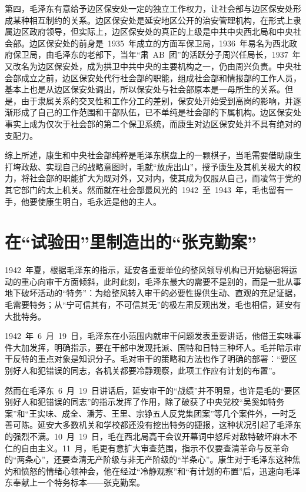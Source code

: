 第四，毛泽东有意给予边区保安处一定的独立工作权力，让社会部与边区保安处形成某种相互制约的关系。边区保安处是延安地区公开的治安管理机构，在形式上隶属边区政府领导，但实际上，边区保安处的真正的上级是中共中央西北局和中央社会部。边区保安处的前身是~1935~年成立的方面军保卫局，1936~年易名为西北政府保卫局，由毛泽东的老部下，当年“肃~AB~团”的活跃分子周兴任局长，1937~年又改名为边区保安处，成为拱卫中共中央的主要机构之一，仍由周兴负责。中央社会部成立之前，边区保安处代行社会部的职能，组成社会部和情报部的工作人员，基本上也是从边区保安处调出，所以保安处与社会部原本是一母所生的关系。但是，由于隶属关系的交叉性和工作分工的差别，保安处开始受到高岗的影响，并逐渐形成了自己的工作范围和干部队伍，已不单纯是社会部的下属机构。边区保安处事实上成为仅次于社会部的第二个保卫系统，而康生对边区保安处并不具有绝对的支配力。

综上所述，康生和中央社会部纯粹是毛泽东棋盘上的一颗棋子，当毛需要借助康生打垮政敌、实现自己的战略意图时，毛就“放虎出山”，授予康生及其机关极大的权力，将社会部的职能扩大为既对外，又对内，使其成为仅服从自己，而凌驾于党的其它部门的太上机关。然而就在社会部最风光的~1942~至~1943~年，毛也留有一手，他要使康生明白，毛永远是他的主人。

\section{在“试验田”里制造出的“张克勤案”}

1942~年夏，根据毛泽东的指示，延安各重要单位的整风领导机构已开始秘密将运动的重心向审干方面倾斜，此时此刻，毛泽东最大的需要不是别的，而是一批从事地下破坏活动的“特务”：为给整风转入审干的必要性提供生动、直观的充足证据，毛需要特务；从“宁可信其有，不可信其无”的极左肃反观出发，毛也相信，延安有大批特务。

1942~年~6~月~19~日，毛泽东在小范围内就审干问题发表重要讲话，他借王实味事件大加发挥，明确指示，要在干部中发现托派、国特和日特三种坏人。毛并暗示审干反特的重点对象是知识分子。毛对审干的策略和方法也作了明确的部署：“要区别好人和犯错误的同志，各机关都要冷静观察，此项工作应有计划的布置”。

然而在毛泽东~6~月~19~日讲话后，延安审干的“战绩”并不明显，也许是毛的“要区别好人和犯错误的同志”的指示发挥了作用，除了破获了中央党校“吴奚如特务案”和“王实味、成全、潘芳、王里、宗铮五人反党集团案”等几个案件外，一时乏善可陈。延安大多数机关和学校都还没有挖出特务的捷报，这种状况引起了毛泽东的强烈不满。10~月~19~日，毛在西北局高干会议开幕词中怒斥对敌特破坏麻木不仁的自由主义。11~月，毛更有意扩大审查范围，指示不仅要查清革命与反革命的“两条心”，还要查清无产阶级与非无产阶级的“半条心”。康生对于毛泽东这种焦灼和愤怒的情绪心领神会，他在经过“冷静观察”和“有计划的布置”后，迅速向毛泽东奉献上一个特务标本——张克勤案。


